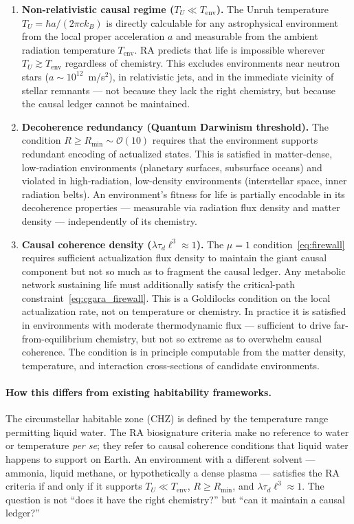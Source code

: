 \documentclass[11pt,a4paper]{article}
\theoremstyle{plain}
\theoremstyle{definition}
\theoremstyle{remark}
\begin{document}
\begin{enumerate}[noitemsep]
  \item \textbf{Non-relativistic causal regime ($T_U \ll T_{\mathrm{env}}$).}
  The Unruh temperature $T_U = \hbar a / (2\pi c k_B)$ is directly calculable
  for any astrophysical environment from the local proper acceleration $a$ and
  measurable from the ambient radiation temperature $T_{\mathrm{env}}$. RA
  predicts that life is impossible wherever $T_U \gtrsim T_{\mathrm{env}}$
  regardless of chemistry. This excludes environments near neutron stars
  ($a \sim 10^{12}$~m/s$^2$), in relativistic jets, and in the immediate
  vicinity of stellar remnants --- not because they lack the right chemistry,
  but because the causal ledger cannot be maintained.

  \item \textbf{Decoherence redundancy (Quantum Darwinism threshold).}
  The condition $R \geq R_{\min} \sim \mathcal{O}(10)$ requires that the
  environment supports redundant encoding of actualized states. This is
  satisfied in matter-dense, low-radiation environments (planetary surfaces,
  subsurface oceans) and violated in high-radiation, low-density environments
  (interstellar space, inner radiation belts). An environment's fitness for life
  is partially encodable in its decoherence properties --- measurable via
  radiation flux density and matter density --- independently of its
  chemistry.

  \item \textbf{Causal coherence density ($\lambda\tau_d\ell^3 \approx 1$).}
  The $\mu = 1$ condition~\eqref{eq:firewall} requires sufficient actualization
  flux density to maintain the giant causal component but not so much as to
  fragment the causal ledger. Any metabolic network sustaining life must
  additionally satisfy the critical-path constraint~\eqref{eq:cgara_firewall}.
  This is a Goldilocks condition on the local actualization
  rate, not on temperature or chemistry. In practice it is satisfied in
  environments with moderate thermodynamic flux --- sufficient to drive
  far-from-equilibrium chemistry, but not so extreme as to overwhelm causal
  coherence. The condition is in principle computable from the matter density,
  temperature, and interaction cross-sections of candidate environments.
\end{enumerate}

\paragraph{How this differs from existing habitability frameworks.}
The circumstellar habitable zone (CHZ) is defined by the temperature range
permitting liquid water. The RA biosignature criteria make no reference to
water or temperature \emph{per se}; they refer to causal coherence conditions
that liquid water happens to support on Earth. An environment with a different
solvent --- ammonia, liquid methane, or hypothetically a dense plasma ---
satisfies the RA criteria if and only if it supports $T_U \ll T_{\mathrm{env}}$,
$R \geq R_{\min}$, and $\lambda\tau_d\ell^3 \approx 1$. The question is not
``does it have the right chemistry?'' but ``can it maintain a causal ledger?''
\end{document}

